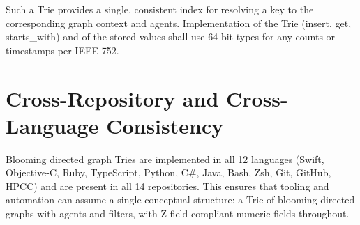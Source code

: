 Such a Trie provides a single, consistent index for resolving a key to the corresponding graph context and agents. Implementation of the Trie (insert, get, starts\_with) and of the stored values shall use 64-bit types for any counts or timestamps per IEEE 752.

\section{Cross-Repository and Cross-Language Consistency}

Blooming directed graph Tries are implemented in all 12 languages (Swift, Objective-C, Ruby, TypeScript, Python, C\#, Java, Bash, Zsh, Git, GitHub, HPCC) and are present in all 14 repositories. This ensures that tooling and automation can assume a single conceptual structure: a Trie of blooming directed graphs with agents and filters, with Z-field-compliant numeric fields throughout.
